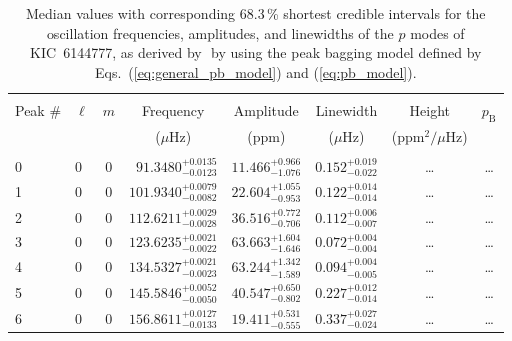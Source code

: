 \begin{table*}[!]
\caption{Median values with corresponding 68.3\,\% shortest credible intervals for the oscillation frequencies, amplitudes, and linewidths of the $p$ modes of KIC~6144777, as derived by \diamonds\,\,by using the peak bagging model defined by Eqs.~(\ref{eq:general_pb_model}) and (\ref{eq:pb_model}).}
\label{tab:6144777p}
\centering
\begin{tabular}{llcrrlrc}
\hline\hline
\\[-8pt]          
Peak \# & $\ell$ & $m$ & \multicolumn{1}{c}{Frequency} & \multicolumn{1}{c}{Amplitude} & \multicolumn{1}{c}{Linewidth} & \multicolumn{1}{c}{Height}& $p_\mathrm{B}$\\
 & & & \multicolumn{1}{c}{($\mu$Hz)} & \multicolumn{1}{c}{(ppm)} & \multicolumn{1}{c}{($\mu$Hz)} & \multicolumn{1}{c}{(ppm$^2/\mu$Hz)}\\
\hline \\[-8pt]
0 & 0 & 0 & $     91.3480_{-      0.0123}^{+      0.0135}$ & $      11.466_{-       1.076}^{+       0.966}$ & $       0.152_{-       0.022}^{+       0.019}$ & \multicolumn{1}{c}{\dots} & \dots \\[1pt]
1 & 0 & 0 & $    101.9340_{-      0.0082}^{+      0.0079}$ & $      22.604_{-       0.953}^{+       1.055}$ & $       0.122_{-       0.014}^{+       0.014}$ & \multicolumn{1}{c}{\dots} & \dots\\[1pt]
2 & 0 & 0 & $    112.6211_{-      0.0028}^{+      0.0029}$ & $      36.516_{-       0.706}^{+       0.772}$ & $       0.112_{-       0.007}^{+       0.006}$ & \multicolumn{1}{c}{\dots} & \dots\\[1pt]
3 & 0 & 0 & $    123.6235_{-      0.0022}^{+      0.0021}$ & $      63.663_{-       1.646}^{+       1.604}$ & $       0.072_{-       0.004}^{+       0.004}$ & \multicolumn{1}{c}{\dots} & \dots \\[1pt]
4 & 0 & 0 & $    134.5327_{-      0.0023}^{+      0.0021}$ & $      63.244_{-       1.589}^{+       1.342}$ & $       0.094_{-       0.005}^{+       0.004}$ & \multicolumn{1}{c}{\dots} & \dots \\[1pt]
5 & 0 & 0 & $    145.5846_{-      0.0050}^{+      0.0052}$ & $      40.547_{-       0.802}^{+       0.650}$ & $       0.227_{-       0.014}^{+       0.012}$ & \multicolumn{1}{c}{\dots} & \dots \\[1pt]
6 & 0 & 0 & $    156.8611_{-      0.0133}^{+      0.0127}$ & $      19.411_{-       0.555}^{+       0.531}$ & $       0.337_{-       0.024}^{+       0.027}$ & \multicolumn{1}{c}{\dots} & \dots \\[1pt]

\end{tabular}
\end{table*}
